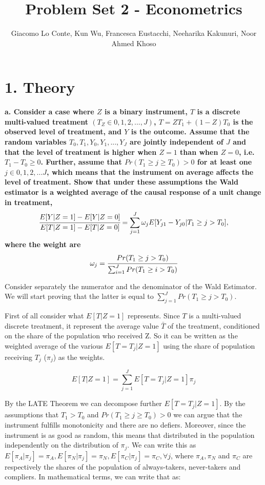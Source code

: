 \documentclass[a4paper,12pt,oneside,English]{article}
\title{Problem Set 2 - Econometrics}
\author{ Giacomo Lo Conte, Kun Wu, Francesca Eustacchi, Neeharika Kakunuri, Noor Ahmed Khoso }
\begin{document}
\maketitle
\section{1. Theory}
\textbf{a. Consider a case where $Z$ is a binary instrument, $T$ is a discrete multi-valued treatment $(T_Z \in {0,1,2,...,J})$, $T = Z T_1 + (1 - Z)T_0$ is the observed level of treatment, and $Y$ is the outcome. Assume that the random variables $T_0, T_1, Y_0, Y_1, . . . , Y_J$ are jointly independent of $J$ and that the level of treatment is higher when $Z = 1$ than when $Z = 0$, i.e. $T_1 - T_0 \geq 0$. Further, assume that $Pr(T_1 \geq j \geq T_0) > 0$ for at least one $j \in {0,1,2,...J}$, which means that the instrument on average affects the level of treatment. Show that under these assumptions the Wald estimator is a weighted average of the causal response of a unit change in treatment,}
\begin{equation}
\label{Title1}
    \cfrac{E[Y| Z = 1] - E[Y | Z = 0]}{E[T| Z = 1] - E[T| Z = 0]} = \sum^J_{j=1} \omega_j  E[Y_{j1} - Y_{j0}|T_1 \geq j > T_0],
\end{equation}
\textbf{where the weight are }
\begin{equation}
\label{Title2}
\omega_j = \cfrac{Pr(T_1\geq j > T_0)}{\sum^J_{i=1}Pr(T_1\geq i > T_0)}
\end{equation}

Consider separately the numerator and the denominator of the Wald Estimator. We will start proving that the latter is equal to $\sum_{j=1}^J Pr(T_1\geq j>T_0)$.

First of all consider what $E[T|Z=1]$ represents. Since $T$ is a multi-valued discrete treatment, it represent the average value $\bar T$ of the treatment, conditioned on the share of the population who received Z. So it can be written as the weighted average of the various $E[T=T_j|Z=1]$ using the share of population receiving $T_j$ ($\pi_j$) as the weights.

\[
E[T|Z=1]=\sum_{j=1}^J E[T=T_j|Z=1] \pi_j
\]

By the LATE Theorem we can decompose further $E[T=T_j|Z=1]$. By the assumptions that $T_1>T_0$ and $Pr(T_1 \geq j \geq T_0) > 0$ we can argue that the instrument fulfills monotonicity and there are no defiers. Moreover, since the instrument is as good as random, this means that distributed in the population independently on the distribution of $\pi_j$. We can write this as $E[\pi_A|\pi_j]=\pi_A,E[\pi_N|\pi_j]=\pi_N,E[\pi_C|\pi_j]=\pi_C,\forall j$, where $\pi_A, \pi_N$ and $\pi_C$ are respectively the shares of the population of always-takers, never-takers and compliers. In mathematical terms, we can write that as:
\end{document}
